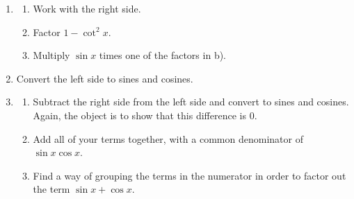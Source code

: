 \documentclass[english]{book}
\begin{document}
\begin{enumerate}
\begin{enumerate}
\begin{enumerate}[\hspace{1cm}a)]
                \item Write the right side with $\cos^{4} x$ as the denominator.
                \item Write $\cos^{4} x = \cos^{2} x (1 - \sin^{2} x)$.
                \item Divide out $1 - \sin x$.
              \end{enumerate}
        \item \begin{enumerate}[\hspace{1cm}a)]
                \item Work with the right side.
                \item Factor $1 - \cot^{2} x$.
                \item Multiply $\sin x$ times one of the factors in b).
              \end{enumerate}
        \item Convert the left side to sines and cosines.
        \item \begin{enumerate}[\hspace{1cm}a)]
                \item Subtract the right side from the left side and convert to sines and cosines. Again, the object is to show that this difference is $0$.
                \item Add all of your terms together, with a common denominator of $\sin x \cos x$.
                \item Find a way of grouping the terms in the numerator in order to factor out the term $\sin x + \cos x$.
              \end{enumerate}
    \end{enumerate}


\end{enumerate}
\end{document}
